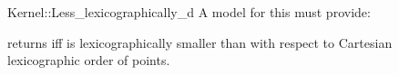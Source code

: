\begin{ccRefFunctionObjectConcept}{Kernel::Less_lexicographically_d}
A model for this must provide:


 {returns  iff  is
  lexicographically smaller than  with respect to Cartesian
  lexicographic order of points.  }

\end{ccRefFunctionObjectConcept}
